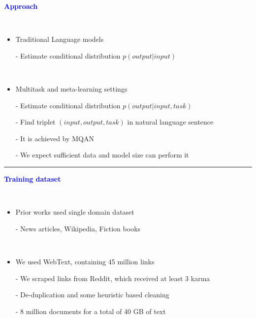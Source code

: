 \documentclass[professionalfont]{beamer}
\begin{document}
\begin{frame}
\begin{refsection}

\begin{center}
    { \textbf{\textcolor{blue}{ {\fontsize{12}{14}\selectfont Approach } }} }
\end{center}
\\[0.5cm]

{\fontsize{10}{14}\selectfont 
\begin{itemize}
    \item Traditional Language models

    - Estimate conditional distribution \( p(output|input) \)
    
    \\[0.5cm]
    
    \item Multitask and meta-learning settings

    - Estimate conditional distribution \( p(output|input, task) \)

    - Find triplet \( (input, output, task) \) in natural language sentence
    
    - It is achieved by MQAN \cite{MQAN}

    - We expect sufficient data and model size can perform it
\end{itemize}
}

\vspace{0.5cm}
\hrule
\printbibliography
\end{refsection} 
\end{frame}

\begin{frame}
\begin{center}
    { \textbf{\textcolor{blue}{ {\fontsize{12}{14}\selectfont Training dataset} }} }
\end{center}
\\[0.5cm]

{\fontsize{10}{14}\selectfont 
\begin{itemize}
    \item Prior works used single domain dataset
    
    - News articles, Wikipedia, Fiction books

    \\[0.5cm]

    \item We used WebText, containing 45 million links

    - We scraped links from Reddit, which received at least 3 karma

    - De-duplication and some heuristic based cleaning

    - 8 million documents for a total of 40 GB of text
\end{itemize}
}

\end{frame}
\end{document}
